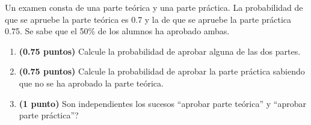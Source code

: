 
Un examen consta de una parte teórica y una parte práctica. La probabilidad de que se apruebe la parte teórica es 0.7 y la de que se apruebe la parte práctica 0.75. Se sabe que el 50\% de los alumnos ha aprobado ambas.
\begin{enumerate}[label=\alph*)]
\item \textbf{(0.75 puntos)} Calcule la probabilidad de aprobar alguna de las dos partes.
\item \textbf{(0.75 puntos)} Calcule la probabilidad de aprobar la parte práctica sabiendo que no se ha aprobado la parte teórica.
\item \textbf{(1 punto)} \textquestiondown{}Son independientes los sucesos ``aprobar parte teórica'' y ``aprobar parte práctica''?
\end{enumerate}
